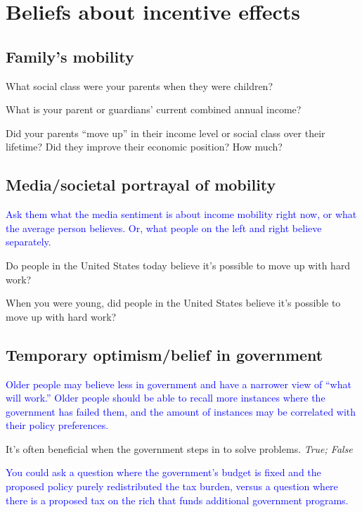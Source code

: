 \documentclass[12pt]{article}
\newcommand{\blue}[1]{\textcolor{blue}{#1}}
\begin{document}
\section{Beliefs about incentive effects}
    
    \subsection{Family's mobility}

    What social class were your parents when they were children?

    What is your parent or guardians’ current combined annual income?

    Did your parents “move up” in their income level or social class over their lifetime? Did they improve their economic position? How much?
    
    \subsection{Media/societal portrayal of mobility}

    \blue{Ask them what the media sentiment is about income mobility right now, or what the average person believes. Or, what people on the left and right believe separately.}

    Do people in the United States today believe it's possible to move up with hard work?

    When you were young, did people in the United States believe it's possible to move up with hard work?
    
    \subsection{Temporary optimism/belief in government}

    \blue{Older people may believe less in government and have a narrower view of ``what will work.'' Older people should be able to recall more instances where the government has failed them, and the amount of instances may be correlated with their policy preferences.}

    It’s often beneficial when the government steps in to solve problems.
    \textit{True; False}

    \blue{You could ask a question where the government's budget is fixed and the proposed policy purely redistributed the tax burden, versus a question where there is a proposed tax on the rich that funds additional government programs.}
\end{document}
